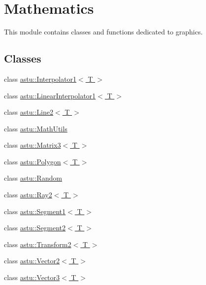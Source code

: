 \hypertarget{group__math__group}{}\section{Mathematics}
\label{group__math__group}


This module contains classes and functions dedicated to graphics.  


\subsection*{Classes}
\begin{DoxyCompactItemize}
\item 
class \hyperlink{classastu_1_1Interpolator1}{astu\+::\+Interpolator1$<$ T $>$}
\item 
class \hyperlink{classastu_1_1LinearInterpolator1}{astu\+::\+Linear\+Interpolator1$<$ T $>$}
\item 
class \hyperlink{classastu_1_1Line2}{astu\+::\+Line2$<$ T $>$}
\item 
class \hyperlink{classastu_1_1MathUtils}{astu\+::\+Math\+Utils}
\item 
class \hyperlink{classastu_1_1Matrix3}{astu\+::\+Matrix3$<$ T $>$}
\item 
class \hyperlink{classastu_1_1Polygon}{astu\+::\+Polygon$<$ T $>$}
\item 
class \hyperlink{classastu_1_1Random}{astu\+::\+Random}
\item 
class \hyperlink{classastu_1_1Ray2}{astu\+::\+Ray2$<$ T $>$}
\item 
class \hyperlink{classastu_1_1Segment1}{astu\+::\+Segment1$<$ T $>$}
\item 
class \hyperlink{classastu_1_1Segment2}{astu\+::\+Segment2$<$ T $>$}
\item 
class \hyperlink{classastu_1_1Transform2}{astu\+::\+Transform2$<$ T $>$}
\item 
class \hyperlink{classastu_1_1Vector2}{astu\+::\+Vector2$<$ T $>$}
\item 
class \hyperlink{classastu_1_1Vector3}{astu\+::\+Vector3$<$ T $>$}
\end{DoxyCompactItemize}
